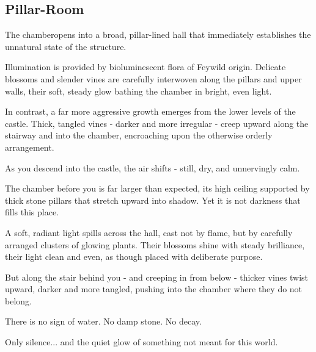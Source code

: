 \subsection*{ Pillar-Room}
{\entryfont The chamberopens into a broad, pillar-lined hall that immediately establishes the unnatural state of the structure.

Illumination is provided by bioluminescent flora of Feywild origin. Delicate blossoms and slender vines are carefully interwoven along the pillars and upper walls, their soft, steady glow bathing the chamber in bright, even light.

In contrast, a far more aggressive growth emerges from the lower levels of the castle. Thick, tangled vines - darker and more irregular - creep upward along the stairway and into the chamber, encroaching upon the otherwise orderly arrangement.}
\begin{DndReadAloud}
	As you descend into the castle, the air shifts - still, dry, and unnervingly calm.

	The chamber before you is far larger than expected, its high ceiling supported by thick stone pillars that stretch upward into shadow. Yet it is not darkness that fills this place.

	A soft, radiant light spills across the hall, cast not by flame, but by carefully arranged clusters of glowing plants. Their blossoms shine with steady brilliance, their light clean and even, as though placed with deliberate purpose.

	But along the stair behind you - and creeping in from below - thicker vines twist upward, darker and more tangled, pushing into the chamber where they do not belong.

	There is no sign of water. No damp stone. No decay.

	Only silence... and the quiet glow of something not meant for this world.
\end{DndReadAloud}
\begingroup
	\DndSetThemeColor[PhbTan]
